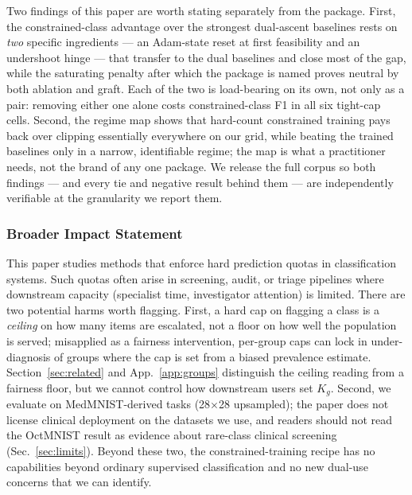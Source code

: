 \documentclass[10pt]{article}
\begin{document}
Two findings of this paper are worth stating separately from the
package. First, the constrained-class advantage over the strongest
dual-ascent baselines rests on \emph{two} specific ingredients --- an
Adam-state reset at first feasibility and an undershoot hinge --- that
transfer to the dual baselines and close most of the gap, while the
saturating penalty after which the package is named proves neutral by
both ablation and graft.{\color{blue} Each of the two is load-bearing on its own,
not only as a pair: removing either one alone costs constrained-class F1 in all
six tight-cap cells.} Second, the regime map shows that hard-count
constrained training pays back over clipping essentially everywhere on
our grid, while beating the trained baselines only in a narrow,
identifiable regime; the map is what a practitioner needs, not the
brand of any one package. We release the full corpus so both findings
--- and every tie and negative result behind them --- are independently
verifiable at the granularity we report them.

\subsubsection*{Broader Impact Statement}
This paper studies methods that enforce hard prediction quotas in
classification systems. Such quotas often arise in screening, audit, or
triage pipelines where downstream capacity (specialist time, investigator
attention) is limited. There are two potential harms worth flagging.
First, a hard cap on flagging a class is a \emph{ceiling} on how many
items are escalated, not a floor on how well the population is served;
misapplied as a fairness intervention, per-group caps can lock in
under-diagnosis of groups where the cap is set from a biased prevalence
estimate. Section~\ref{sec:related} and App.~\ref{app:groups} distinguish
the ceiling reading from a fairness floor, but we cannot control how
downstream users set $K_g$. Second, we evaluate on MedMNIST-derived
tasks (28$\times$28 upsampled); the paper does not license clinical
deployment on the datasets we use, and readers should not read the
OctMNIST result as evidence about rare-class clinical screening
(Sec.~\ref{sec:limits}). Beyond these two, the constrained-training
recipe has no capabilities beyond ordinary supervised classification and
no new dual-use concerns that we can identify.
\end{document}
